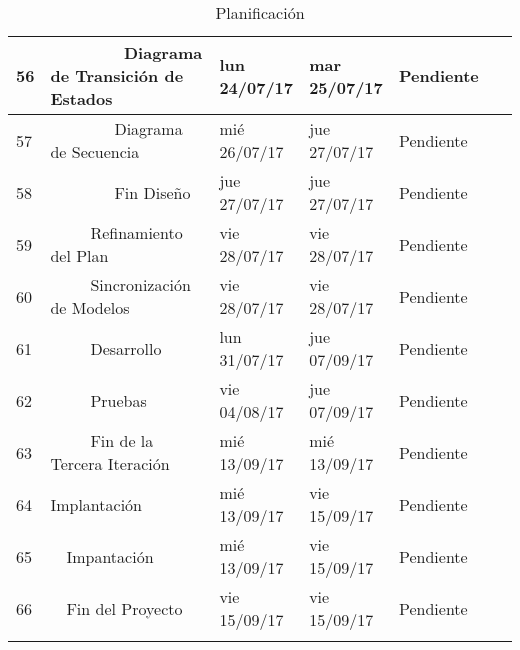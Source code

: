 \begin{center}
\begin{longtable}{ l l l l l l}
	56 &         Diagrama de Transición de Estados & lun 24/07/17 & mar 25/07/17 & Pendiente & \  \\ \hline
	57 &         Diagrama de Secuencia & mié 26/07/17 & jue 27/07/17 & Pendiente & \  \\ \hline
	58 &         Fin Diseño & jue 27/07/17 & jue 27/07/17 & Pendiente & \  \\ \hline
	59 &      Refinamiento del Plan & vie 28/07/17 & vie 28/07/17 & Pendiente & \  \\ \hline
	60 &      Sincronización de Modelos & vie 28/07/17 & vie 28/07/17 & Pendiente & \  \\ \hline
	61 &      Desarrollo & lun 31/07/17 & jue 07/09/17 & Pendiente & \  \\ \hline
	62 &      Pruebas & vie 04/08/17 & jue 07/09/17 & Pendiente & \  \\ \hline
	63 &      Fin de la Tercera Iteración & mié 13/09/17 & mié 13/09/17 & Pendiente & \  \\ \hline
	64 & Implantación & mié 13/09/17 & vie 15/09/17 & Pendiente & \  \\ \hline
	65 &   Impantación & mié 13/09/17 & vie 15/09/17 & Pendiente & \  \\ \hline
	66 &   Fin del Proyecto & vie 15/09/17 & vie 15/09/17 & Pendiente & \  \\ \hline
\caption{Planificación}
\label{tab:Planificación_2}
\end{longtable}
\end{center}

\newpage
